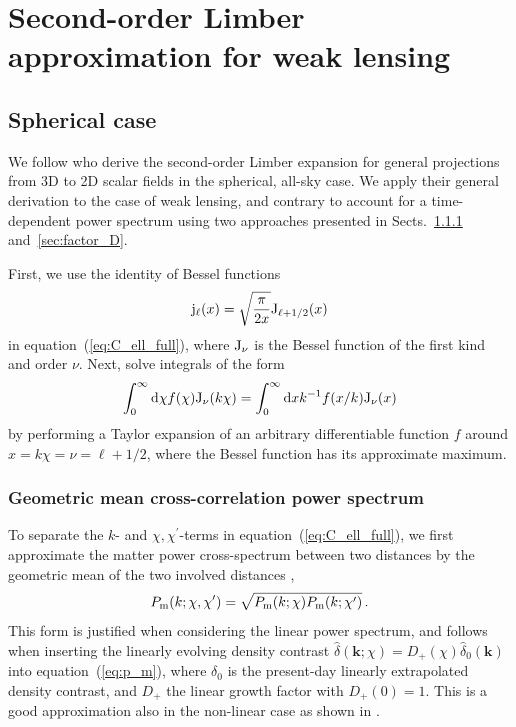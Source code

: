 \documentclass[fleqn,usenatbib]{mnras} %
\renewcommand{\vec}{\bm}
\begin{document}
\section{Second-order Limber approximation for weak lensing}
\label{sec:L2}

\subsection{Spherical case}

We follow \cite{2008PhRvD..78l3506L} who derive the second-order Limber
expansion for general projections from 3D to 2D scalar fields in the spherical,
all-sky case. We apply their general derivation to the case of weak lensing,
and contrary to \cite{2008PhRvD..78l3506L} account for a time-dependent power
spectrum using two approaches presented in Sects.~\ref{sec:geom_mean} and~\ref{sec:factor_D}.

First, we use the identity of Bessel functions
%
\begin{equation}
  {\rm j}_\ell(x) = \sqrt{\frac{\pi}{2x}} {\rm J}_{\ell + 1/2}(x)
  \label{eq:jJ}
\end{equation}
%
in equation~(\ref{eq:C_ell_full}), where ${\rm J}_\nu$ is the Bessel function of the first kind
and order $\nu$. Next, \cite{2008PhRvD..78l3506L} solve integrals of
the form
%
\begin{equation}
  \int_0^\infty {\rm d} \chi f(\chi) {\rm J}_\nu(k \chi)
  = \int_0^\infty {\rm d} x k^{-1} f(x/k) {\rm J}_\nu(x)
  \label{eq:int_dchi}
\end{equation}
%
by performing a Taylor expansion of an arbitrary differentiable function
$f$ around $x = k \chi = \nu = \ell + 1/2$, where the Bessel function has its
approximate maximum.

\subsubsection{Geometric mean cross-correlation power spectrum}
\label{sec:geom_mean}

To separate the $k$- and $\chi, \chi^\prime$-terms in
equation~(\ref{eq:C_ell_full}), we first approximate the matter power
cross-spectrum between two distances by the geometric mean of the two involved
distances \citep{2005PhRvD..72b3516C,2016arXiv161200770K},
%
\begin{equation}
 P_{\rm m}(k; \chi, \chi^\prime) = \sqrt{ P_{\rm m}(k; \chi) P_{\rm m}(k; \chi^\prime) } \, .
  \label{eq:P_geom_mean}
\end{equation}
%
This form is justified when considering the linear power spectrum, and
follows when inserting the linearly evolving density contrast $\hat \delta(\vec
k; \chi) = D_+(\chi) \hat \delta_0(\vec k)$ into equation~(\ref{eq:p_m}), where
$\delta_0$ is the present-day linearly extrapolated density contrast, and $D_+$
the linear growth factor with $D_+(0) = 1$. This is a good approximation
also in the non-linear case as shown in \cite{2016arXiv161200770K}.
\end{document}

